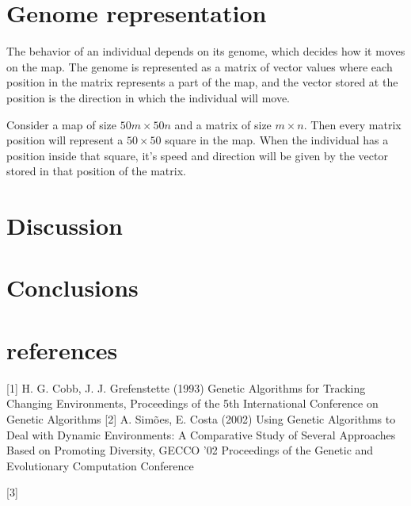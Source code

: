 \documentclass[a4paper,12pt]{article}
\begin{document}
\section{Genome representation}
The behavior of an individual depends on its genome, which decides how it moves on the map. The genome is represented as a matrix of vector values where each position in the matrix represents a part of the map, and the vector stored at the position is the direction in which the individual will move.

Consider a map of size $50m \times 50n$ and a matrix of size $m \times n$. Then every matrix position will represent a $50\times50$ square in the map. When the individual has a position inside that square, it's speed and direction will be given by the vector stored in that position of the matrix.


\section{Discussion}

\section{Conclusions}

\section{references}
[1] H. G. Cobb, J. J. Grefenstette (1993) Genetic Algorithms for Tracking Changing Environments, Proceedings of the 5th International Conference on Genetic Algorithms
[2] A. Simões, E. Costa (2002) Using Genetic Algorithms to Deal with Dynamic Environments: A Comparative Study of Several Approaches Based on Promoting Diversity, GECCO '02 Proceedings of the Genetic and Evolutionary Computation Conference

[3]
\end{document}
